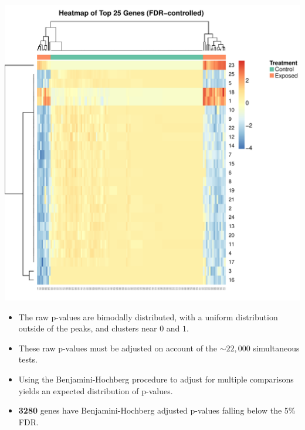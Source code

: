 \documentclass[landscape,a0paper,fontscale=0.285]{baposter} %
\newcommand{\compresslist}{ %
\setlength{\itemsep}{1pt}
\setlength{\parskip}{0pt}
\setlength{\parsep}{0pt}
}
\newcommand{\1}{\mathbbm{1}}
\begin{document}
\begin{poster}
{\begin{multicols}{2}
\begin{center}
\includegraphics[scale=0.3]{topGenesHeatmap}
\end{center}

\end{multicols}


\begin{multicols}{2}

\begin{itemize}\compresslist
\item The raw p-values are bimodally distributed, with a uniform distribution outside 
of the peaks, and clusters near $0$ and $1$. 
\item These raw p-values must be adjusted on account of the $\sim 22,000$ 
simultaneous  tests.
\end{itemize}

\begin{itemize}\compresslist
\item Using the Benjamini-Hochberg procedure to adjust for multiple comparisons 
yields an expected distribution of p-values.
\item \textbf{3280} genes have Benjamini-Hochberg adjusted p-values falling below the 
5\% FDR.
\end{itemize}


\end{multicols}}
\end{poster}
\end{document}
